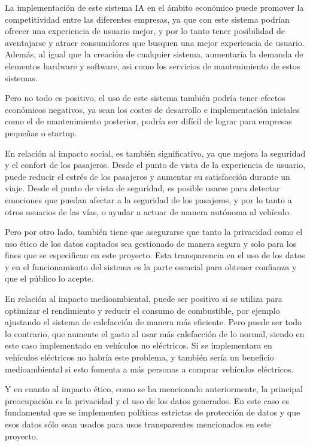 \documentclass[12pt]{report} %
\begin{document}
La implementación de este sistema IA en el ámbito económico puede promover la competitividad entre las diferentes empresas, ya que con este sistema podrían ofrecer una experiencia de usuario mejor, y por lo tanto tener posibilidad de aventajarse y atraer consumidores que busquen una mejor experiencia de usuario. Además, al igual que la creación de cualquier sistema, aumentaría la demanda de elementos hardware y software, asi como los servicios de mantenimiento de estos sistemas.

Pero no todo es positivo, el uso de este sistema también podría tener efectos económicos negativos, ya sean los costes de desarrollo e implementación iniciales como el de mantenimiento posterior, podría ser difícil de lograr para empresas pequeñas o startup.

En relación al impacto social, es también significativo, ya que mejora la seguridad y el confort de los pasajeros. Desde el punto de vista de la experiencia de usuario, puede reducir el estrés de los pasajeros y aumentar su satisfacción durante un viaje. Desde el punto de vista de seguridad, es posible usarse para detectar emociones que puedan afectar a la seguridad de los pasajeros, y por lo tanto a otros usuarios de las vías, o ayudar a actuar de manera autónoma al vehículo.

Pero por otro lado, también tiene que asegurarse que tanto la privacidad como el uso ético de los datos captados sea gestionado de manera segura y solo para los fines que se especifican en este proyecto. Esta transparencia en el uso de los datos y en el funcionamiento del sistema es la parte esencial para obtener confianza y que el público lo acepte.

En relación al impacto medioambiental, puede ser positivo si se utiliza para optimizar el rendimiento y reducir el consumo de combustible, por ejemplo ajustando el sistema de calefacción de manera más eficiente. Pero puede ser todo lo contrario, que aumente el gasto al usar más calefacción de lo normal, siendo en este caso implementado en vehículos no eléctricos. Si se implementara en vehículos eléctricos no habría este problema, y también sería un beneficio medioambiental si esto fomenta a más personas a comprar vehículos eléctricos.

Y en cuanto al impacto ético, como se ha mencionado anteriormente, la principal preocupación es la privacidad y el uso de los datos generados. En este caso es fundamental que se implementen políticas estrictas de protección de datos y que esos datos sólo sean usados para usos transparentes mencionados en este proyecto.
\end{document}
